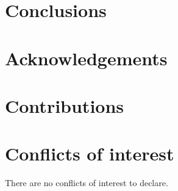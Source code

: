 \documentclass[
    9pt,            %
    commun,         %
    lineno,         %
    tocfig,         %
    affiltop,       %
    debug,          %
]{pi-article}
\begin{document}
\lipsum[2-4] %

\section{Conclusions}
\lipsum[6-6] %

\section*{Acknowledgements}
\lipsum[7-7] %

\section*{Contributions}
\lipsum[8-8] %

\section*{Conflicts of interest}
There are no conflicts of interest to declare.




\end{document}
